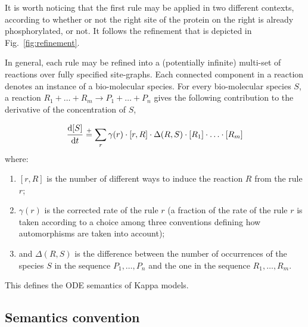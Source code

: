 \documentclass[11pt]{book}
\begin{document}
It is worth noticing that the first rule may be applied in two different contexts, according to whether or not the right site  of the protein on the right  is already phosphorylated, or not. It follows the refinement that is depicted in Fig.~\ref{fig:refinement}.

In general, each rule may be refined into a (potentially infinite) multi-set of reactions over fully specified site-graphs.
Each connected component in a reaction denotes an instance of a bio-molecular species. For every bio-molecular species $S$, a reaction $R_1 + \ldots + R_m {\rightarrow} P_1 + \ldots + P_n$ gives the following contribution to the derivative of the concentration of $S$,

\newcommand{\myfrac}[2]{\frac{\strut \displaystyle #1}{\strut \displaystyle #2}}
\newcommand{\diff}[1]{\myfrac{\mathrm{d}#1}{\mathrm{d}t}}

\begin{equation*}
  \diff{[S]} \stackrel{+}= \sum_r \gamma(r)\cdot[r,R]\cdot\Delta(R,S)\cdot [R_1] \cdot \ldots \cdot [R_m]
\end{equation*}
where:
\begin{enumerate}
  \item $[r,R]$ is the number of different ways to induce the reaction $R$ from the rule $r$;
  \item $\gamma(r)$ is the corrected rate of the rule $r$ (a fraction of the rate of the rule $r$ is taken according to a choice among three  conventions defining how automorphisms are taken into account);
  \item and $\Delta(R,S)$ is the difference between the number of occurrences of the species $S$ in the sequence $P_1,\ldots,P_n$ and
the one in the sequence $R_1,\ldots,R_m$.
 \end{enumerate}

 This defines the ODE semantics of Kappa models.

\subsection{Semantics convention}
\end{document}
